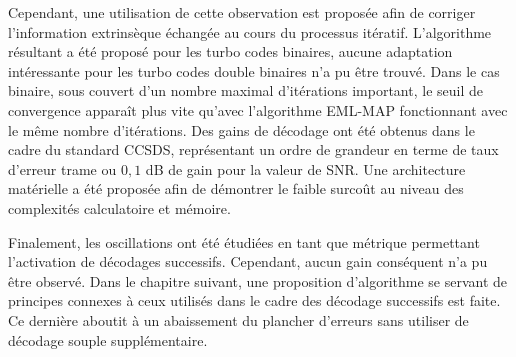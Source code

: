 Cependant, une utilisation de cette observation est proposée afin de corriger l'information extrinsèque échangée au 
cours du processus itératif. L'algorithme résultant a été proposé pour les turbo codes binaires, aucune adaptation intéressante 
pour les turbo codes double binaires n'a pu être trouvé. Dans le cas binaire, sous couvert d'un nombre maximal d'itérations
important, le seuil de convergence apparaît plus vite qu'avec l'algorithme EML-MAP fonctionnant avec le même nombre 
d'itérations. Des gains de décodage ont été obtenus dans le cadre du standard CCSDS, représentant un ordre de grandeur en terme de taux d'erreur trame 
ou $0,1$ dB de gain pour la valeur de SNR. Une architecture matérielle a été proposée afin de démontrer le faible surcoût au niveau des complexités
calculatoire et mémoire.

Finalement, les oscillations ont été étudiées en tant que métrique permettant l'activation de décodages successifs. 
Cependant, aucun gain conséquent n'a pu être observé. Dans le chapitre suivant, une proposition d'algorithme se servant de 
 principes connexes à ceux utilisés dans le cadre des décodage successifs est faite. Ce dernière aboutit à un abaissement
du plancher d'erreurs sans utiliser de décodage souple supplémentaire.